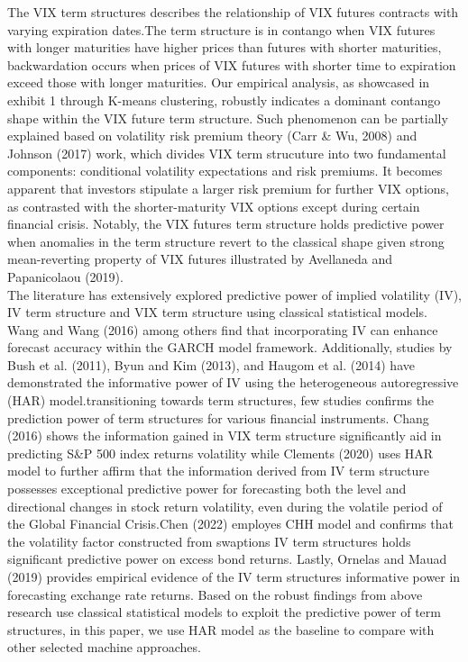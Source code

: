 \documentclass[10pt,letterpaper]{article}
\begin{document}
The VIX term structures describes the relationship of VIX futures contracts with varying expiration dates.The term structure is in contango when VIX futures with longer maturities have higher prices than futures with shorter maturities, backwardation occurs when prices of VIX futures with shorter time to expiration exceed those with longer maturities. Our empirical analysis,  as showcased in exhibit 1 through K-means clustering, robustly indicates a dominant contango shape within the VIX future term structure. Such phenomenon can be partially explained based on volatility risk premium theory (Carr \& Wu, 2008) and  Johnson (2017) work, which divides VIX term strucuture  into two fundamental components: conditional volatility expectations and risk premiums. It becomes apparent that investors stipulate a larger risk premium for further VIX options, as contrasted with the shorter-maturity VIX options except during certain financial crisis. Notably, the VIX futures term structure holds predictive power when anomalies in the term structure revert to the classical shape given strong mean-reverting property of VIX futures illustrated by Avellaneda and Papanicolaou (2019).
\\The literature has extensively explored predictive power of implied volatility (IV),  IV term structure and VIX term structure using classical statistical models. Wang and Wang (2016) among others find that incorporating IV can enhance forecast accuracy within the GARCH model framework. Additionally, studies by Bush et al. (2011), Byun and Kim (2013), and Haugom et al. (2014) have demonstrated the informative power of IV using the heterogeneous autoregressive (HAR) model.transitioning towards term structures, few studies confirms the prediction power of term structures for various financial instruments. Chang (2016) shows the information gained in VIX term structure significantly aid in predicting S\&P 500 index returns volatility while Clements (2020) uses HAR model to further affirm that the information derived from IV term structure possesses exceptional predictive power for forecasting both the level and directional changes in stock return volatility, even during the volatile period of the Global Financial Crisis.Chen (2022) employes CHH model and confirms that the volatility factor constructed from swaptions IV term structures holds significant predictive power on excess bond returns. Lastly, Ornelas and Mauad (2019) provides empirical evidence of the IV term structures informative power in forecasting exchange rate returns. Based on the robust findings from above research use classical statistical models to exploit the predictive power of term structures, in this paper, we use HAR model as the baseline to compare with other selected machine approaches.
\end{document}
